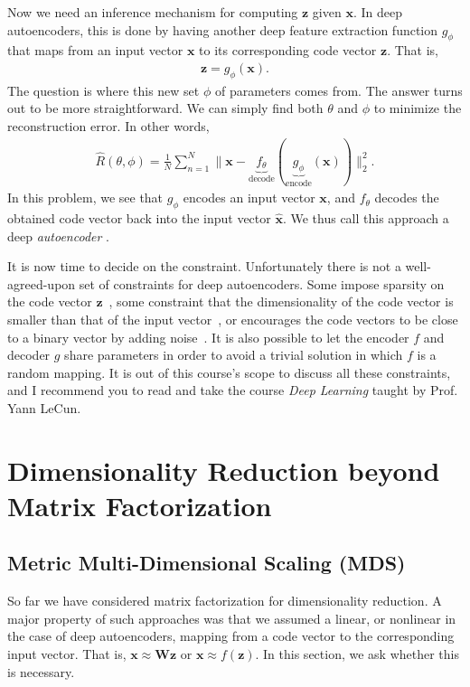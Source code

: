 \documentclass{report}
\newcommand{\vect}[1]{\mathbf{#1}}
\newcommand{\matr}[1]{\mathbf{#1}}
\newcommand{\vx}[0]{\vect{x}}
\newcommand{\vz}[0]{\vect{z}}
\newcommand{\mW}[0]{\matr{W}}
\begin{document}
Now we need an inference mechanism for computing $\vz$ given $\vx$. In deep
autoencoders, this is done by having another deep feature extraction function
$g_{\phi}$ that maps from an input vector $\vx$ to its corresponding code vector
$\vz$. That is,
\begin{align*}
    \vz = g_{\phi}(\vx).
\end{align*}
The question is where this new set $\phi$ of parameters comes from. The answer
turns out to be more straightforward. We can simply find both $\theta$ and
$\phi$ to minimize the reconstruction error. In other words,
\begin{align*}
    \hat{R}(\theta, \phi) = \frac{1}{N} \sum_{n=1}^N \| \vx -
    \underbrace{f_{\theta}}_{\text{decode}}(\underbrace{g_{\phi}}_{\text{encode}}(\vx)) \|^2_2.
\end{align*}
In this problem, we see that $g_{\phi}$ encodes an input vector $\vx$, and
$f_{\theta}$ decodes the obtained code vector back into the input vector
$\hat{\vx}$. We thus call this approach a deep {\it autoencoder}
\cite{hinton2006reducing}. 

It is now time to decide on the constraint. Unfortunately there is not a
well-agreed-upon set of constraints for deep autoencoders. Some impose sparsity
on the code vector $\vz$~\cite{cho2013simple}, some constraint that the
dimensionality of the code vector is smaller than that of the input
vector~\cite{hinton2006reducing}, or encourages the code vectors to be close to
a binary vector by adding noise~\cite{salakhutdinov2009semantic}. It is also
possible to let the encoder $f$ and decoder $g$ share parameters in order to
avoid a trivial solution in which $f$ is a random mapping. It is out of this
course's scope to discuss all these constraints, and I recommend you to read
\cite{goodfellow2016deep} and take the course {\it Deep Learning} taught by
Prof. Yann LeCun.


\section{Dimensionality Reduction beyond Matrix Factorization}

\subsection{Metric Multi-Dimensional Scaling (MDS)}

So far we have considered matrix factorization for dimensionality reduction. A
major property of such approaches was that we assumed a linear, or nonlinear in
the case of deep autoencoders, mapping from a code vector to the corresponding
input vector. That is, $\vx \approx \mW \vz$ or $\vx \approx f(\vz)$. In this
section, we ask whether this is necessary. 
\end{document}
